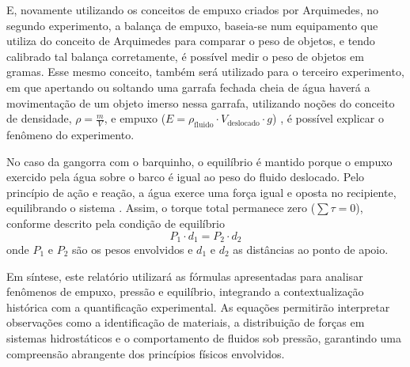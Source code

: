 E, novamente utilizando os conceitos de empuxo criados por Arquimedes, no
segundo experimento, a balança de empuxo, baseia-se num equipamento que utiliza
do conceito de Arquimedes para comparar o peso de objetos, e tendo calibrado tal
balança corretamente, é possível medir o peso de objetos em gramas. Esse mesmo
conceito, também será utilizado para o terceiro experimento, em que apertando ou
soltando uma garrafa fechada cheia de água haverá a movimentação de um objeto
imerso nessa garrafa, utilizando noções do conceito de densidade, $\rho =
\frac{m}{V}$, e empuxo ($E = \rho_{\text{fluido}} \cdot V_{\text{deslocado}}
\cdot g$) \cite{nussenzveig2014}, é possível explicar o fenômeno do
experimento.

No caso da gangorra com o barquinho, o equilíbrio é mantido porque o empuxo
exercido pela água sobre o barco é igual ao peso do fluido deslocado. Pelo
princípio de ação e reação, a água exerce uma força igual e oposta no
recipiente, equilibrando o sistema \cite{nussenzveig2014}. Assim, o torque total
permanece zero ($\sum \tau = 0$), conforme descrito pela condição de equilíbrio
\begin{equation}
	P_1 \cdot d_1 = P_2 \cdot d_2 \label{eq:equilibrio}
\end{equation}
onde $P_1$ e $P_2$ são os pesos envolvidos e $d_1$ e $d_2$ as distâncias ao
ponto de apoio.

Em síntese, este relatório utilizará as fórmulas apresentadas para analisar
fenômenos de empuxo, pressão e equilíbrio, integrando a contextualização
histórica com a quantificação experimental. As equações permitirão interpretar
observações como a identificação de materiais, a distribuição de forças em
sistemas hidrostáticos e o comportamento de fluidos sob pressão, garantindo uma
compreensão abrangente dos princípios físicos envolvidos.

